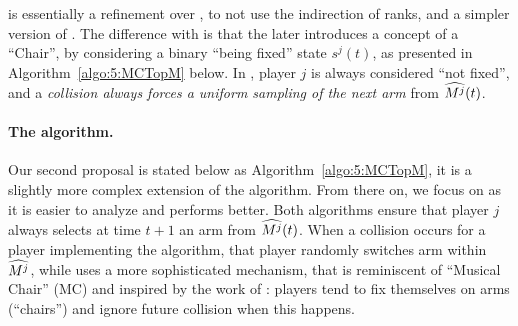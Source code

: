 \RandTopM{} is essentially a refinement over \RhoRand, to not use the indirection of ranks, and a simpler version of \MCTopM.
The difference with \MCTopM{} is that the later introduces a concept of a ``Chair'', by considering a binary ``being fixed'' state $s^j(t)$, as presented in Algorithm~\ref{algo:5:MCTopM} below.
%
In \RandTopM{}, player $j$ is always considered ``not fixed'',
and a \emph{collision always forces a uniform sampling of the next arm} from $\widehat{M^j}(t)$.




\paragraph{The \MCTopM{} algorithm.}
%
Our second proposal \MCTopM{} is stated below as Algorithm~\ref{algo:5:MCTopM},
it is a slightly more complex extension of the \RandTopM{} algorithm.
From there on, we focus on \MCTopM{} as it is easier to analyze and performs better.
%
Both algorithms ensure that player $j$ always
selects at time $t+1$ an arm from $\widehat{M^j}(t)$.
When a collision occurs for a player implementing the \RandTopM{} algorithm, that player randomly switches arm within $\widehat{M^j}$, while \MCTopM{} uses a more sophisticated mechanism, that is reminiscent of ``Musical Chair'' (MC) and inspired by the work of \cite{Rosenski16}: players tend to fix themselves on arms (``chairs'') and ignore future collision when this happens.



